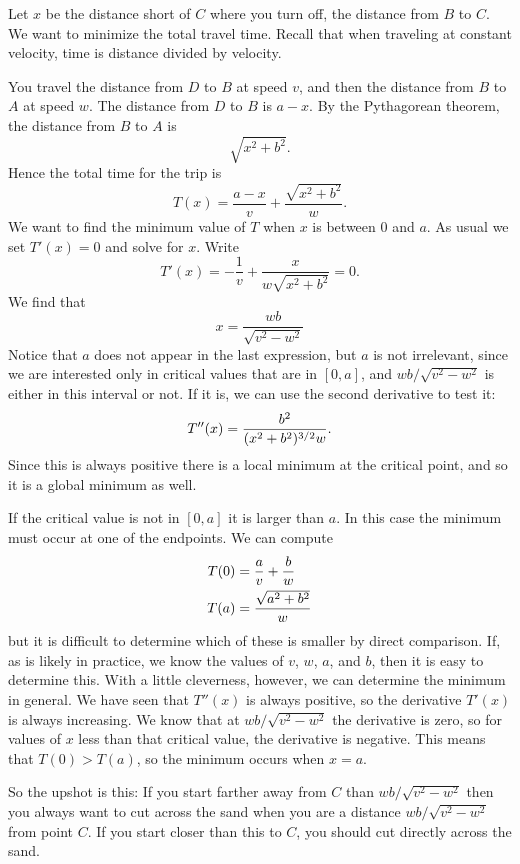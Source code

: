 \begin{solution}
Let $x$ be the distance short of $C$ where you turn off, the distance
from $B$ to $C$.  We want to minimize the total travel time.  Recall
that when traveling at constant velocity, time is distance divided by
velocity.

You travel the distance from $D$ to $B$ at speed $v$, and then the
distance from $B$ to $A$ at speed $w$.  The distance from $D$ to $B$
is $a-x$. By the Pythagorean theorem, the distance from $B$ to $A$
is
\[
\sqrt{x^2+b^2}.
\] 
Hence the total time for the trip is
\[
   T(x)=\frac{a-x}{v}+\frac{\sqrt{x^2+b^2}}{w}.
\]
We want to find the minimum value of $T$ when $x$ is between 0 and
$a$.  As usual we set $T'(x)=0$ and solve for $x$. Write
\[
  T'(x)=-\frac{1}{v}+\frac{x}{w\sqrt{x^2+b^2}} =0.
\]
We find that 
\[
x=\frac{wb}{\sqrt{v^2-w^2}}
\]
Notice that $a$ does not appear in the last expression, but $a$ is not
irrelevant, since we are interested only in critical values that are
in $[0,a]$, and $wb/\sqrt{v^2-w^2}$ is either in this interval or not.
If it is, we can use the second derivative to test it:
\[
T''(x) = {b^2\over (x^2+b^2)^{3/2}w}.
\]
Since this is always positive there is a local minimum at the critical
point, and so it is a global minimum as well.

If the critical value is not in $[0,a]$ it is larger than $a$. In this
case the minimum must occur at one of the endpoints. We can compute
\begin{align*}
T(0)&={a\over v}+{b\over w} \\
T(a)&={\sqrt{a^2+b^2}\over w} 
\end{align*}
but it is difficult to determine which of these is smaller by direct
comparison. If, as is likely in practice, we know the values of $v$,
$w$, $a$, and $b$, then it is easy to determine this. With a little
cleverness, however, we can determine the minimum in general. We have seen that
$T''(x)$ is always positive, so the derivative $T'(x)$ is always increasing.
We know that at $wb/\sqrt{v^2-w^2}$ the derivative is zero, so for
values of $x$ less than that critical value, the derivative is
negative. This means that $T(0)>T(a)$, so the minimum occurs when $x=a$.

So the upshot is this: If you start farther away from $C$ than
$wb/\sqrt{v^2-w^2}$ then you always want to cut across the sand 
when you are a distance $wb/\sqrt{v^2-w^2}$ from point $C$. If you
start closer than this to $C$, you should cut directly across the sand.
\end{solution}



